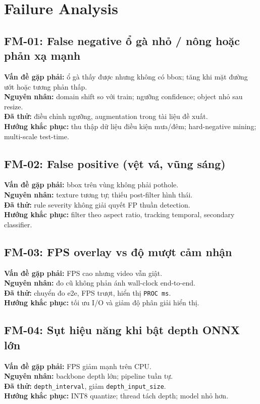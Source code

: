 \documentclass[12pt,a4paper]{article}
\begin{document}
\section{Failure Analysis}

\subsection*{FM-01: False negative ổ gà nhỏ / nông hoặc phản xạ mạnh}
\textbf{Vấn đề gặp phải:} ổ gà thấy được nhưng không có bbox; tăng khi mặt đường ướt hoặc tương phản thấp.\\
\textbf{Nguyên nhân:} domain shift so với train; ngưỡng confidence; object nhỏ sau resize.\\
\textbf{Đã thử:} điều chỉnh ngưỡng, augmentation trong tài liệu đề xuất.\\
\textbf{Hướng khắc phục:} thu thập dữ liệu điều kiện mưa/đêm; hard-negative mining; multi-scale test-time.

\subsection*{FM-02: False positive (vệt vá, vũng sáng)}
\textbf{Vấn đề gặp phải:} bbox trên vùng không phải pothole.\\
\textbf{Nguyên nhân:} texture tương tự; thiếu post-filter hình thái.\\
\textbf{Đã thử:} rule severity không giải quyết FP thuần detection.\\
\textbf{Hướng khắc phục:} filter theo aspect ratio, tracking temporal, secondary classifier.

\subsection*{FM-03: FPS overlay vs độ mượt cảm nhận}
\textbf{Vấn đề gặp phải:} FPS cao nhưng video vẫn giật.\\
\textbf{Nguyên nhân:} đo cũ không phản ánh wall-clock end-to-end.\\
\textbf{Đã thử:} chuyển đo e2e, FPS trượt, hiển thị \texttt{PROC ms}.\\
\textbf{Hướng khắc phục:} tối ưu I/O và giảm độ phân giải hiển thị.

\subsection*{FM-04: Sụt hiệu năng khi bật depth ONNX lớn}
\textbf{Vấn đề gặp phải:} FPS giảm mạnh trên CPU.\\
\textbf{Nguyên nhân:} backbone depth lớn; pipeline tuần tự.\\
\textbf{Đã thử:} \texttt{depth\_interval}, giảm \texttt{depth\_input\_size}.\\
\textbf{Hướng khắc phục:} INT8 quantize; thread tách depth; model nhỏ hơn.
\end{document}
